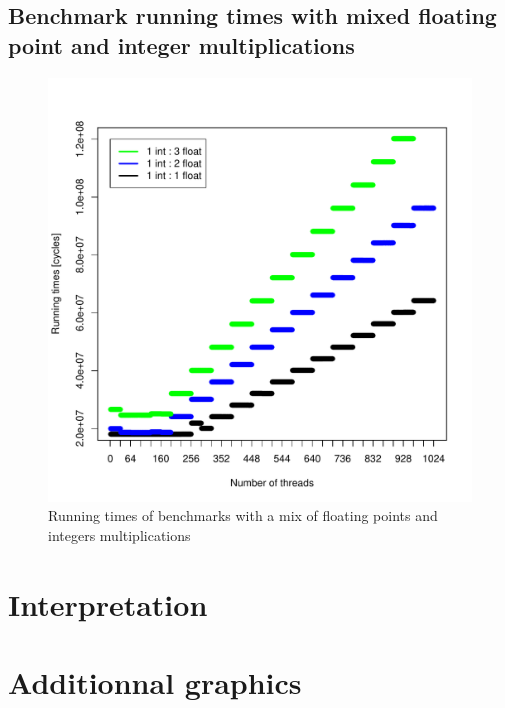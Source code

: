 \documentclass{article}
\begin{document}
	\subsection{Benchmark running times with mixed floating point and integer multiplications}
	\begin{figure}[h]
        \includegraphics[width=\linewidth]{"graphics/running_times_mixed"}
        \caption{Running times of benchmarks with a mix of floating points and integers multiplications}
    \end{figure}
	\pagebreak

\section{Interpretation}

\section{Additionnal graphics}
\end{document}
